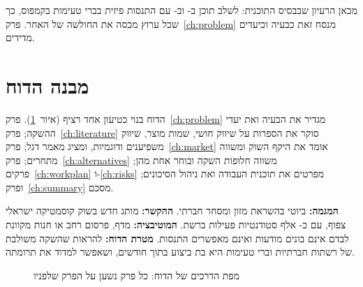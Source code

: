 מכאן הרעיון שבבסיס התוכנית: לשלב תוכן ב- וב- עם
התנסות פיזית בברי טעימות בקמפוס, כך שכל ערוץ מכסה את החולשה של
האחר. פרק~\ref{ch:problem} מנסח זאת כבעיה וכיעדים מדידים.

\section{מבנה הדוח}
\label{sec:intro-structure}

הדוח בנוי כטיעון אחד רציף (איור~\ref{fig:roadmap}). פרק~\ref{ch:problem} מגדיר
את הבעיה ואת יעדי ההשקה; פרק~\ref{ch:literature} סוקר את הספרות על שיווק חושי,
שמות מוצר, שיווק משפיענים ודוגמיות, ומציג מאמר דגל; פרק~\ref{ch:market} אומד את היקף השוק
ומשווה מתחרים; פרק~\ref{ch:alternatives} משווה חלופות השקה ובוחר אחת מהן;
פרקים~\ref{ch:workplan} ו-\ref{ch:risks} מפרטים את תוכנית העבודה ואת ניהול
הסיכונים; ופרק~\ref{ch:summary} מסכם.

\begin{insightbox}
\textbf{המגמה:} ביוטי בהשראת מזון ומסחר חברתי. \textbf{ההקשר:} מותג חדש בשוק
קוסמטיקה ישראלי צפוף, עם כ- אלף סטודנטיות פעילות ברשת.
\textbf{המוטיבציה:} מדף, פרסום רחב או חנות מקוונת לבדם אינם בונים מודעות ואינם
מאפשרים התנסות. \textbf{מטרת הדוח:} להראות שהשקה משולבת של רשתות חברתיות
וברי טעימות היא בת ביצוע בתוך  חודשים, ושאפשר למדוד את תרומתה.
\end{insightbox}

\begin{figure}[htbp]
  \begin{diagram}
    
  \end{diagram}
  \caption{מפת הדרכים של הדוח: כל פרק נשען על הפרק שלפניו}
  \label{fig:roadmap}
\end{figure}
